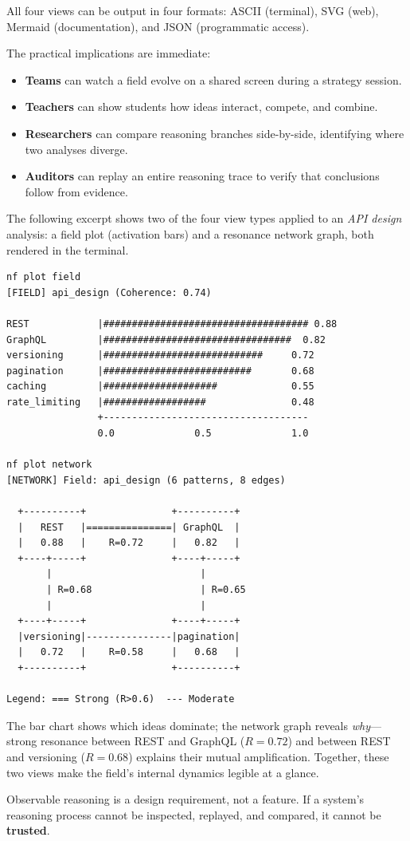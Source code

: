 All four views can be output in four formats: ASCII (terminal),
SVG (web), Mermaid (documentation), and JSON (programmatic access).

The practical implications are immediate:
\begin{itemize}[leftmargin=*]
\item \textbf{Teams} can watch a field evolve on a shared screen
  during a strategy session.
\item \textbf{Teachers} can show students how ideas interact,
  compete, and combine.
\item \textbf{Researchers} can compare reasoning branches
  side-by-side, identifying where two analyses diverge.
\item \textbf{Auditors} can replay an entire reasoning trace to
  verify that conclusions follow from evidence.
\end{itemize}

\noindent
The following excerpt shows two of the four view types applied to an
\emph{API design} analysis: a field plot (activation bars) and a
resonance network graph, both rendered in the terminal.

\begin{terminalbox}
\begin{lstlisting}[style=neosshell]
nf plot field
[FIELD] api_design (Coherence: 0.74)

REST            |#################################### 0.88
GraphQL         |#################################  0.82
versioning      |############################     0.72
pagination      |##########################       0.68
caching         |####################             0.55
rate_limiting   |##################               0.48
                +------------------------------------
                0.0              0.5              1.0

nf plot network
[NETWORK] Field: api_design (6 patterns, 8 edges)

  +----------+               +----------+
  |   REST   |===============| GraphQL  |
  |   0.88   |    R=0.72     |   0.82   |
  +----+-----+               +----+-----+
       |                          |
       | R=0.68                   | R=0.65
       |                          |
  +----+-----+               +----+-----+
  |versioning|---------------|pagination|
  |   0.72   |    R=0.58     |   0.68   |
  +----------+               +----------+

Legend: === Strong (R>0.6)  --- Moderate
\end{lstlisting}
\end{terminalbox}

\noindent
The bar chart shows which ideas dominate; the network graph reveals
\emph{why}---strong resonance between REST and GraphQL ($R=0.72$)
and between REST and versioning ($R=0.68$) explains their mutual
amplification.  Together, these two views make the field's internal
dynamics legible at a glance.

\begin{calloutbox}
Observable reasoning is a design requirement, not a feature.  If a
system's reasoning process cannot be inspected, replayed, and
compared, it cannot be \textbf{trusted}.
\end{calloutbox}
